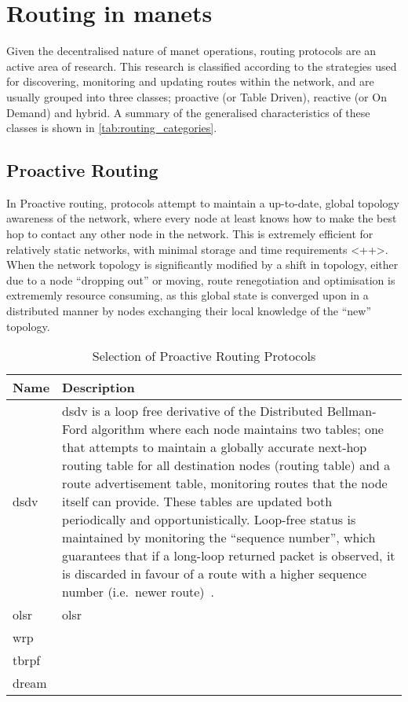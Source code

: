 \section{Routing in \glspl{manet}}

Given the decentralised nature of \gls{manet} operations, routing protocols are an active area of research. 
This research is classified according to the strategies used for discovering, monitoring and updating routes within the network, and are usually grouped into three classes; proactive (or Table Driven), reactive (or On Demand) and hybrid.
A summary of the generalised characteristics of these classes is shown in \autoref{tab:routing_categories}.

\subsection{Proactive Routing}

In Proactive routing, protocols attempt to maintain a up-to-date, global topology awareness of the network, where every node at least knows how to make the best hop to contact any other node in the network.
This is extremely efficient for relatively static networks, with minimal storage and time requirements \cite{}<++>.
When the network topology is significantly modified by a shift in topology, either due to a node ``dropping out'' or moving, route renegotiation and optimisation is extrememly resource consuming, as this global state is converged upon in a distributed manner by nodes exchanging their local knowledge of the ``new'' topology.

\begin{table}\centering
  \caption[Selection of Proactive Routing Protocols]{Selection of Proactive Routing Protocols}
  \label{tab:proactive_routing_protocols}
  \begin{tabularx}{\textwidth}{p{1.25cm}|X}\toprule
    Name & Description \\ \midrule
    \gls{dsdv} & \acrlong{dsdv} is a loop free derivative of the Distributed Bellman-Ford algorithm where each node maintains two tables; one that attempts to maintain a globally accurate next-hop routing table for all destination nodes (routing table) and a route advertisement table, monitoring routes that the node itself can provide. These tables are updated both periodically and opportunistically. Loop-free status is maintained by monitoring the ``sequence number'', which guarantees that if a long-loop returned packet is observed, it is discarded in favour of a route with a higher sequence number (i.e.\ newer route)~\cite{Perkins1994}.\\
    \gls{olsr} & \acrlong{olsr} \\
    \gls{wrp} & \\
    \gls{tbrpf} & \\
    \gls{dream} & \\
    \bottomrule
  \end{tabularx}
\end{table}


